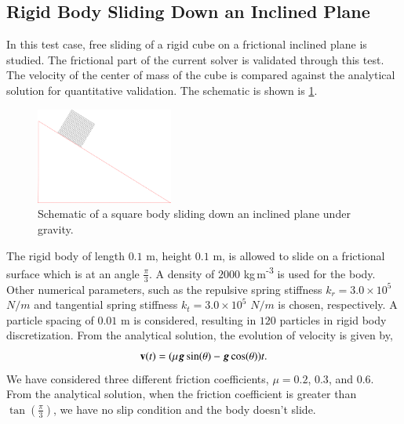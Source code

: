 \FloatBarrier%
\subsection{Rigid Body Sliding Down an Inclined Plane}
\label{sec:rigid-body-sliding}
In this test case, free sliding of a rigid cube on a frictional inclined plane
is studied. The frictional part of the current solver is validated through this
test. The velocity of the center of mass of the cube is compared against the
analytical solution for quantitative validation. The schematic is shown is
\cref{fig:rigid_body_sliding}.
\begin{figure}[!htpb]
  \centering
  \includegraphics[width=0.4\textwidth]{images/rfc/images/rigid_body_sliding/schematic}
  \caption{Schematic of a square body sliding down an inclined plane under gravity.}
\label{fig:rigid_body_sliding}
\end{figure}
The rigid body of length $0.1$ m, height $0.1$ m, is allowed to slide on a
frictional surface which is at an angle $\frac{\pi}{3}$. A density of $2000$
kg\,m\textsuperscript{-3} is used for the body. Other numerical parameters, such
as the repulsive spring stiffness $k_r=3.0 \times 10^{5}$ $N/m$ and tangential
spring stiffness $k_t=3.0 \times 10^{5}$ $N/m$ is chosen, respectively. A
particle spacing of $0.01$ m is considered, resulting in $120$ particles in
rigid body discretization. From the analytical solution, the evolution of
velocity is given by,
\begin{equation}
  \label{eq:rfc:ce}
  \mathbf{v}(t) = (\mu \boldsymbol{g} \sin (\theta) - \boldsymbol{g} \cos (\theta)) t.
\end{equation}
We have considered three different friction coefficients, $\mu=0.2$,
$0.3$, and $0.6$. From the analytical solution, when the friction
coefficient is greater than $\tan(\frac{\pi}{3})$, we have no slip condition
and the body doesn't slide.

